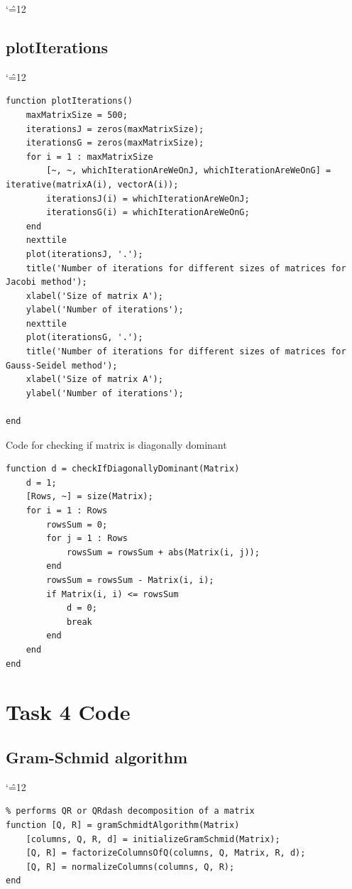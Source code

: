 \documentclass[12pt]{report}
\newenvironment{simplechar}{%
   \catcode`\^=12
}{}
\begin{document}
\begin{simplechar}
\newpage
\hypertarget{function_3_plot}{\subsection{plotIterations}}
\begin{simplechar}
\begin{lstlisting}
function plotIterations()
    maxMatrixSize = 500;
    iterationsJ = zeros(maxMatrixSize);
    iterationsG = zeros(maxMatrixSize);
    for i = 1 : maxMatrixSize
        [~, ~, whichIterationAreWeOnJ, whichIterationAreWeOnG] = iterative(matrixA(i), vectorA(i));
        iterationsJ(i) = whichIterationAreWeOnJ;
        iterationsG(i) = whichIterationAreWeOnG;
    end
    nexttile
    plot(iterationsJ, '.');
    title('Number of iterations for different sizes of matrices for Jacobi method');
    xlabel('Size of matrix A');
    ylabel('Number of iterations');
    nexttile
    plot(iterationsG, '.');
    title('Number of iterations for different sizes of matrices for Gauss-Seidel method');
    xlabel('Size of matrix A');
    ylabel('Number of iterations');

end
\end{lstlisting}
\end{simplechar}

\newpage
\hypertarget{function_3_dominant}{Code for checking if matrix is diagonally dominant}
\begin{lstlisting}
function d = checkIfDiagonallyDominant(Matrix)
    d = 1;
    [Rows, ~] = size(Matrix);
    for i = 1 : Rows
        rowsSum = 0;
        for j = 1 : Rows
            rowsSum = rowsSum + abs(Matrix(i, j));
        end
        rowsSum = rowsSum - Matrix(i, i);
        if Matrix(i, i) <= rowsSum
            d = 0;
            break
        end
    end
end
\end{lstlisting}
\end{simplechar}


\newpage
\section{Task 4 Code}
\subsection{Gram-Schmid algorithm}

\begin{simplechar}
\begin{lstlisting}
% performs QR or QRdash decomposition of a matrix
function [Q, R] = gramSchmidtAlgorithm(Matrix)
    [columns, Q, R, d] = initializeGramSchmid(Matrix);
    [Q, R] = factorizeColumnsOfQ(columns, Q, Matrix, R, d);
    [Q, R] = normalizeColumns(columns, Q, R);
end
\end{lstlisting}
\end{simplechar}
\end{document}
